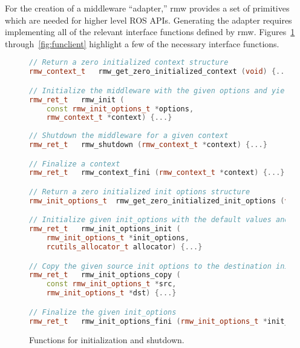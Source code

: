         For the creation of a middleware ``adapter,'' \textsf{rmw} provides a set of primitives which are needed for higher level \ac{ROS} \ac{API}s. Generating the adapter requires implementing all of the relevant interface functions defined by \textsf{rmw}. Figures~\ref{fig:funinit} through~\ref{fig:funclient} highlight a few of the necessary interface functions.



        \begin{figure}[htbp]
            \begin{lstlisting}[language=C++]
// Return a zero initialized context structure
rmw_context_t 	rmw_get_zero_initialized_context (void) {...}

// Initialize the middleware with the given options and yield a context
rmw_ret_t 	rmw_init (
    const rmw_init_options_t *options, 
    rmw_context_t *context) {...}
    
// Shutdown the middleware for a given context
rmw_ret_t 	rmw_shutdown (rmw_context_t *context) {...}

// Finalize a context
rmw_ret_t 	rmw_context_fini (rmw_context_t *context) {...}

// Return a zero initialized init options structure
rmw_init_options_t 	rmw_get_zero_initialized_init_options (void) {...}

// Initialize given init_options with the default values and implementation specific values
rmw_ret_t 	rmw_init_options_init (
    rmw_init_options_t *init_options, 
    rcutils_allocator_t allocator) {...}

// Copy the given source init options to the destination init options
rmw_ret_t 	rmw_init_options_copy (
    const rmw_init_options_t *src, 
    rmw_init_options_t *dst) {...}

// Finalize the given init_options
rmw_ret_t 	rmw_init_options_fini (rmw_init_options_t *init_options) {...}\end{lstlisting}
            \caption{Functions for initialization and shutdown.}
            \label{fig:funinit}
        \end{figure}


